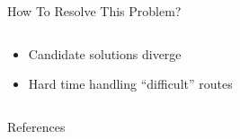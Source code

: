 \documentclass[aspectratio=169,dvipsnames]{beamer}
\begin{document}
\begin{frame}[label={sec:orgb4863ce}]{How To Resolve This Problem?}
\begin{columns}
\begin{column}{0.5\columnwidth}
\begin{itemize}
\item Candidate solutions diverge
\item Hard time handling ``difficult'' routes
\end{itemize}
\end{column}
\end{columns}
\end{frame}

\begin{frame}[label={sec:orgd5b9eda}]{References}


\end{frame}
\end{document}
